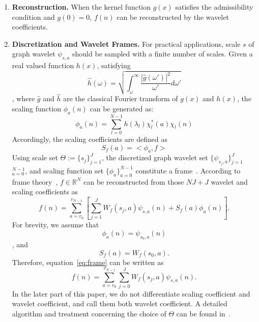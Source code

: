 \documentclass[conference]{IEEEtran}
\begin{document}
 \begin{enumerate}
 \item \textbf{Reconstruction.}
 When the kernel function $g(x)$ satisfies the admissibility condition and $g(0)=0$,  $f(n)$ can be reconstructed by the wavelet coefficients.
\item \textbf{Discretization and Wavelet Frames.} For practical applications, scale $s$ of graph wavelet $\psi_{s,a}$ should be sampled with a finite number of scales. Given a real valued function $h(x)$, satisfying
\begin{equation}
\hat{h}(\omega) = \sqrt{\int_\omega^\infty\frac{|\hat{g}(\omega')|^2}{\omega'}d{\omega'} }
\end{equation}
, where $\hat{g}$ and $\hat{h}$ are the classical Fourier transform of $g(x)$ and $h(x)$, the scaling function $\phi_{a}(n)$ can be generated as:
\begin{equation}
\label{eq:graphscaledefinition}
\phi_{a}(n) = \sum\limits_{l=0}^{N-1}h(\lambda_l)\chi_l^*(a)\chi_l(n)
\end{equation}
Accordingly, the scaling coefficients are defined as
\begin{equation}
S_f(a)=<\phi_a,f>
\end{equation}
Using scale set $\Theta:=\{s_j\}_{j=1}^J$, the discretized graph wavelet set $\{\psi_{s_j,a}\}_{j=1}^{J}$ $_{a=0}^{N-1}$, and scaling function set $\{\phi_a\}_{a=0}^{N-1}$ constitute a frame~\cite{hammond2011wavelets}.
According to frame theory~\cite{daubechies1992ten}, $f\in \mathbb{R}^N$ can be reconstructed from those $NJ+J$ wavelet and scaling coefficients as
\begin{equation}
\label{eq:frame}
f(n)=\sum_{a=v_0}^{v_{N-1}}[\sum_{j=1}^{J}W_{f}(s_j,a)\psi_{s,a}(n)+S_f(a)\phi_{a}(n)].
\end{equation}For brevity, we assume that
\begin{equation}
\phi_a(n)=\psi_{s_0,a}(n)
\end{equation}, and
\begin{equation}
S_f(a)=W_f(s_0,a).
\end{equation}Therefore, equation~\ref{eq:frame} can be written as
\begin{equation}
\label{eq:frame2}
f(n)=\sum_{a=v_0}^{v_{N-1}}\sum_{j=0}^{J}W_{f}(s_j,a)\psi_{s,a}(n).
\end{equation}In the later part of this paper, we do not differentiate scaling coefficient and wavelet coefficient, and call them both wavelet coefficient. A detailed algorithm and treatment concerning the choice of $\Theta$ can be found in~\cite{hammond2011wavelets}.



\end{enumerate}
\end{document}
